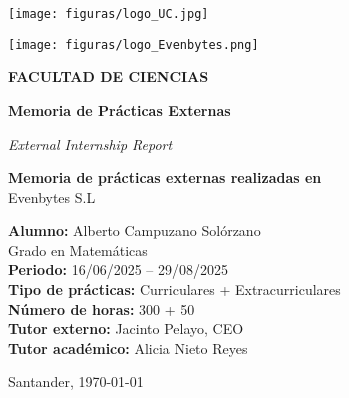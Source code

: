 
\thispagestyle{empty}
\begin{titlepage}
\begin{center}

\begin{minipage}{0.6\textwidth}
\raggedright
\texttt{[image: figuras/logo\_UC.jpg]}
\end{minipage}
\hfill
\begin{minipage}{0.32\textwidth}
\raggedleft
\texttt{[image: figuras/logo\_Evenbytes.png]}
\end{minipage}

\vspace{2cm}

{\Large \textbf{FACULTAD DE CIENCIAS}}

\vspace{1cm}

{\Huge \textbf{Memoria de Prácticas Externas}}

\vspace{0.5cm}

{\large \textit{External Internship Report}}

\vspace{1cm}

\textbf{Memoria de prácticas externas realizadas en}\\[0.5cm]
{\large Evenbytes S.L}

\vfill

\textbf{Alumno:} Alberto Campuzano Solórzano \\
Grado en Matemáticas \\[0.3cm]
\textbf{Periodo:} 16/06/2025 – 29/08/2025 \\
\textbf{Tipo de prácticas:} Curriculares + Extracurriculares \\
\textbf{Número de horas:} 300 + 50 \\[0.5cm]
\textbf{Tutor externo:} Jacinto Pelayo, CEO \\
\textbf{Tutor académico:} Alicia Nieto Reyes

\vspace{1cm}

Santander, \today

\end{center}
\end{titlepage}